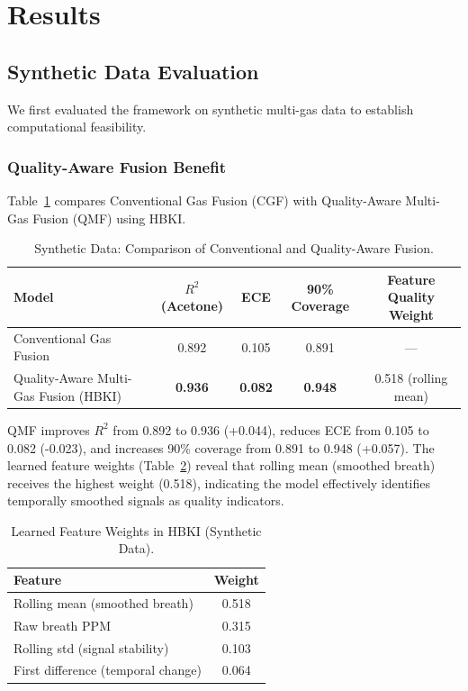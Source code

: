 \documentclass{ieeeaccess}
\begin{document}

\section{Results}
\label{sec:results}

\subsection{Synthetic Data Evaluation}

We first evaluated the framework on synthetic multi-gas data to establish computational feasibility.

\subsubsection{Quality-Aware Fusion Benefit}

Table~\ref{tab:synthetic_results} compares Conventional Gas Fusion (CGF) with Quality-Aware Multi-Gas Fusion (QMF) using HBKI.

\begin{table}[!t]
\centering
\caption{Synthetic Data: Comparison of Conventional and Quality-Aware Fusion.}
\label{tab:synthetic_results}
\setlength{\tabcolsep}{8pt}
\begin{tabular}{lcccc}
\toprule
\textbf{Model} &
\textbf{$R^2$ (Acetone)} &
\textbf{ECE} &
\textbf{90\% Coverage} &
\textbf{Feature Quality Weight} \\
\midrule
Conventional Gas Fusion
& 0.892 & 0.105 & 0.891 & — \\
Quality-Aware Multi-Gas Fusion (HBKI)
& \textbf{0.936} & \textbf{0.082} & \textbf{0.948} & 0.518 (rolling mean) \\
\bottomrule
\end{tabular}
\end{table}

QMF improves $R^2$ from 0.892 to 0.936 (+0.044), reduces ECE from 0.105 to 0.082 (-0.023), and increases 90\% coverage from 0.891 to 0.948 (+0.057). The learned feature weights (Table~\ref{tab:feature_weights}) reveal that rolling mean (smoothed breath) receives the highest weight (0.518), indicating the model effectively identifies temporally smoothed signals as quality indicators.

\begin{table}[htbp]
\centering
\caption{Learned Feature Weights in HBKI (Synthetic Data).}
\label{tab:feature_weights}
\begin{tabular}{lc}
\toprule
\textbf{Feature} & \textbf{Weight} \\
\midrule
Rolling mean (smoothed breath) & 0.518 \\
Raw breath PPM & 0.315 \\
Rolling std (signal stability) & 0.103 \\
First difference (temporal change) & 0.064 \\
\bottomrule
\end{tabular}
\end{table}
\end{document}
